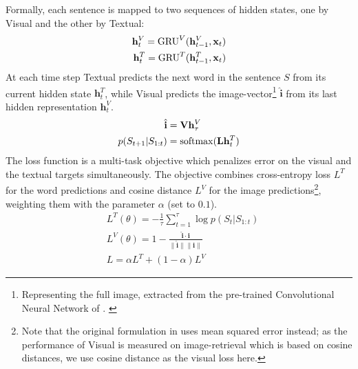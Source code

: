Formally, each sentence is mapped to two sequences of hidden states, 
one by {\sc Visual} and the other by {\sc Textual}:
\vspace{-.2cm}
\begin{align}
  \mathbf{h}^{V}_t = \mathrm{GRU}^V(\mathbf{h}^{V}_{t-1},\mathbf{x}_t)\\
  \mathbf{h}^{T}_t = \mathrm{GRU}^T(\mathbf{h}^{T}_{t-1},\mathbf{x}_t)
\vspace{-.1cm}
\end{align}
%
At each time step {\sc Textual} predicts the next word in the sentence
$S$ from its current hidden state $\mathbf{h}^{T}_t$, while {\sc
  Visual} predicts the image-vector\footnote{Representing the full image, 
  extracted from the pre-trained Convolutional Neural Network of 
  . \label{edit:dumdumeddy}}
$\hat{\mathbf{i}}$ from its last
hidden representation $\mathbf{h}^{V}_t$.
%
\vspace{-.2cm}
\begin{align}
   \hat{\mathbf{i}} &= \mathbf{V} \mathbf{h}^{V}_\tau \\
    p(S_{t+1}|S_{1:t}) &= \mathrm{softmax}(\mathbf{L}\mathbf{h}^T_t)
\vspace{-.1cm}
\end{align}
%
The loss function is a multi-task objective which penalizes error on
the visual and the textual targets simultaneously. The objective
combines cross-entropy loss $L^{T}$ for the word predictions
and cosine distance $L^V$ for the image
predictions\footnote{Note that the original formulation in
   uses mean squared error instead; as the performance of
{\sc Visual} is measured on image-retrieval which is based on cosine 
distances, we use cosine distance as the visual loss here.\label{ft:imaginet}}, weighting them with the parameter $\alpha$ (set to $0.1$).
%
\begin{align}
&L^{T}(\theta) = {-} \frac{1}{\tau}\sum_{t=1}^\tau \log p(S_t|S_{1:t}) \\
%
&L^V(\theta) =  1 - \frac{\hat{\mathbf{i}} \cdot \mathbf{i}}{\| \hat{\mathbf{i}} \| \| \mathbf{i} \|} \\
%
\label{eq:losscombo}
&L = \alpha L^T + (1-\alpha)L^{V}
\end{align}
%

